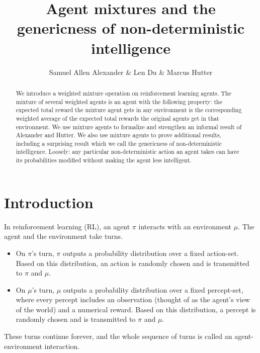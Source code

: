 \documentclass[twoside]{article}
\begin{document}

 \title{Agent mixtures and the genericness of non-deterministic intelligence}
\author{Samuel Allen Alexander \& Len Du \& Marcus Hutter}


\maketitle

\begin{abstract}
    We introduce a weighted mixture operation on
    reinforcement learning agents. The mixture of several weighted agents is
    an agent with the
    following property: the expected total reward the mixture agent
    gets in any environment is the corresponding weighted average
    of the expected total rewards the original agents get in that
    environment. We use mixture agents to formalize and
    strengthen an informal result of Alexander and Hutter. We also use mixture
    agents to prove additional results, including a surprising result
    which we call the genericness of non-deterministic intelligence. Loosely:
    any particular non-deterministic action an agent takes
    can have its probabilities modified without making the agent less
    intelligent.
\end{abstract}

\section{Introduction}

In reinforcement learning (RL), an agent $\pi$ interacts with an environment $\mu$.
The agent and the environment take turns.
\begin{itemize}
\item
On $\pi$'s turn, $\pi$
outputs a probability distribution over a fixed action-set.
Based on this distribution, an action is randomly chosen
and is transmitted to $\pi$ and $\mu$.
\item
On $\mu$'s turn, $\mu$
outputs a probability distribution over a fixed percept-set,
where every percept includes an observation (thought of as
the agent's view of the world) and a numerical reward.
Based on this distribution, a percept is randomly chosen and
is transmitted to $\pi$ and $\mu$.
\end{itemize}
These turns continue forever, and the whole sequence of turns
is called an agent-environment interaction.
\end{document}
